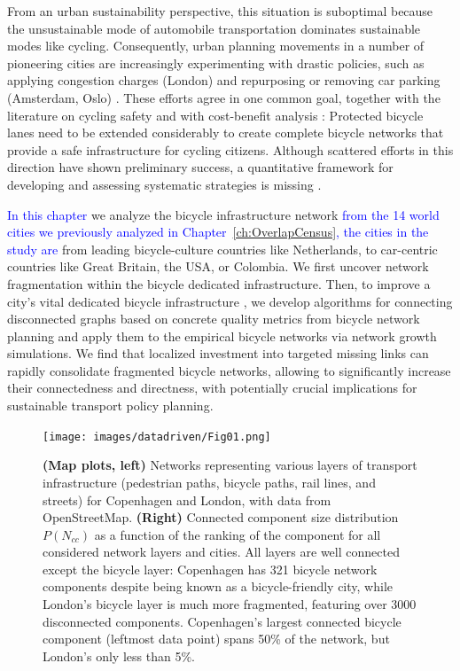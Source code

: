 From an urban sustainability perspective, this situation is suboptimal because the unsustainable mode of automobile transportation dominates sustainable modes like cycling. Consequently, urban planning movements in a number of pioneering cities are increasingly experimenting with drastic policies, such as applying congestion charges (London) \cite{Eliasson2008Lessons} and repurposing or removing car parking (Amsterdam, Oslo) \cite{Littke2016parklets,bliss2019hcp,Nieuwenhuijsen2016Car}. These efforts agree in one common goal, together with the literature on cycling safety \cite{Reynolds2009impact,Teschke2012route,Pucher2016Safer,aldred2018cycling} and with cost-benefit analysis \cite{gossling2019social}: Protected bicycle lanes need to be extended considerably to create complete bicycle networks that provide a safe infrastructure for cycling citizens. Although scattered efforts in this direction have shown preliminary success, a quantitative framework for developing and assessing systematic strategies is missing \cite{Gossling2020Cities}.

\textcolor{blue}{In this chapter} we analyze the bicycle infrastructure network \textcolor{blue}{from the 14 world cities we previously analyzed in Chapter~\ref{ch:OverlapCensus}, the cities in the study are} from leading bicycle-culture countries like Netherlands, to car-centric countries like Great Britain, the USA, or Colombia. We first uncover network fragmentation within the bicycle dedicated infrastructure. Then, to improve a city's vital dedicated bicycle infrastructure \cite{Dill2013Bicycle,Schoner2014Missing,Hull2014Infrastructure,Buehler2016Bikable}, we develop algorithms for connecting disconnected graphs based on concrete quality metrics from bicycle network planning \cite{Twaddell2018Multimodal} and apply them to the empirical bicycle networks via network growth simulations. We find that localized investment into targeted missing links can rapidly consolidate fragmented bicycle networks, allowing to significantly increase their connectedness and directness, with potentially crucial implications for sustainable transport policy planning.

\begin{figure}[th!]
  \centering
  \texttt{[image: images/datadriven/Fig01.png]}
  \caption[Multimodal configuration]{\textbf{(Map plots, left)} Networks representing various layers of transport infrastructure (pedestrian paths, bicycle paths, rail lines, and streets) for Copenhagen and London, with data from OpenStreetMap. \textbf{(Right)} Connected component size distribution $P(N_{cc})$ as a function of the ranking of the component for all considered network layers and cities. All layers are well connected except the bicycle layer: Copenhagen has 321 bicycle network components despite being known as a bicycle-friendly city, while London's bicycle layer is much more fragmented, featuring over 3000 disconnected components. Copenhagen's largest connected bicycle component (leftmost data point) spans 50\% of the network, but London's only less than 5\%.}
  \label{fig:Multimodal}
\end{figure}

